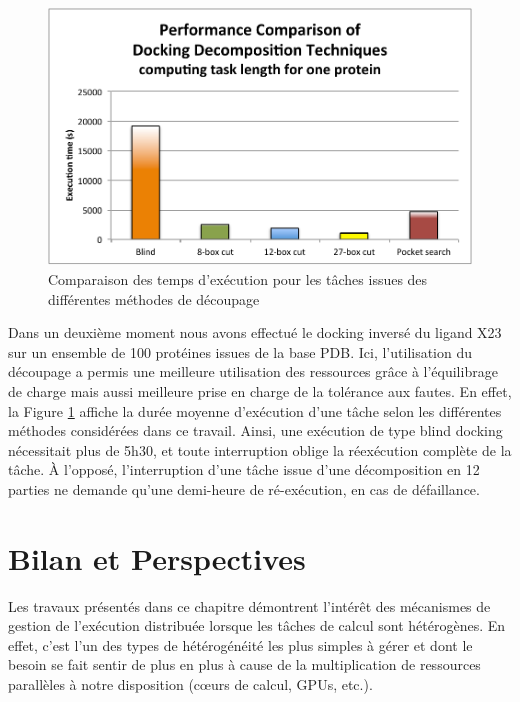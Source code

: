 \begin{figure}
	\centering
		\includegraphics[width=0.5\linewidth]{images/Romain/fig7-color}
		\caption{Comparaison des temps d'exécution pour les tâches issues des différentes méthodes de découpage}\label{fig:performance} %

\end{figure}


 
Dans un deuxième moment nous avons effectué le docking inversé du ligand X23 sur un ensemble de 100 protéines issues de la base PDB. Ici, l'utilisation du découpage a permis une  meilleure utilisation des ressources grâce à l'équilibrage de charge %
mais aussi meilleure prise en charge de la tolérance aux fautes. En effet, la Figure \ref{fig:performance} affiche la durée moyenne d'exécution d'une tâche selon les différentes méthodes considérées dans ce travail. Ainsi, une exécution de type blind docking nécessitait plus de 5h30, et toute interruption oblige la réexécution complète de la tâche. À l'opposé, l'interruption d'une tâche issue d'une décomposition en 12 parties ne demande qu'une demi-heure de ré-exécution, en cas de défaillance.  


 

\section{Bilan et Perspectives} 

Les travaux présentés dans ce chapitre démontrent l'intérêt des mécanismes de gestion de l'exécution distribuée lorsque les tâches de calcul sont hétérogènes. En effet, c'est l'un des types de hétérogénéité les plus simples à gérer et dont le besoin se fait sentir de plus en plus à cause de la multiplication de ressources parallèles à notre disposition (c{\oe}urs de calcul, GPUs, etc.). 

